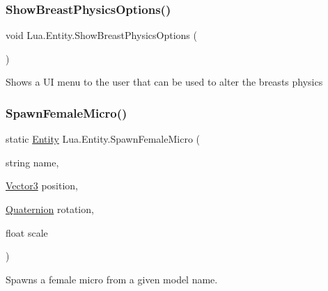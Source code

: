 \mbox{\label{class_lua_1_1_entity_ac2bbfd97ccf17d7cd96fb1cf3b3c51e4}} 
\subsubsection{\texorpdfstring{ShowBreastPhysicsOptions()}{ShowBreastPhysicsOptions()}}
{\footnotesize\ttfamily void Lua.\+Entity.\+Show\+Breast\+Physics\+Options (\begin{DoxyParamCaption}{ }\end{DoxyParamCaption})}



Shows a UI menu to the user that can be used to alter the breasts physics 

\mbox{\label{class_lua_1_1_entity_a347a27b3fea83b83461600b3b80ce5d8}} 
\subsubsection{\texorpdfstring{SpawnFemaleMicro()}{SpawnFemaleMicro()}}
{\footnotesize\ttfamily static \mbox{\hyperlink{class_lua_1_1_entity}{Entity}} Lua.\+Entity.\+Spawn\+Female\+Micro (\begin{DoxyParamCaption}\item[{string}]{name,  }\item[{\mbox{\hyperlink{class_lua_1_1_vector3}{Vector3}}}]{position,  }\item[{\mbox{\hyperlink{class_lua_1_1_quaternion}{Quaternion}}}]{rotation,  }\item[{float}]{scale }\end{DoxyParamCaption})\hspace{0.3cm}{\ttfamily [static]}}



Spawns a female micro from a given model name. 

\mbox{\label{class_lua_1_1_entity_a582caed51f918e3d7642a7ec8a227fd1}} 
